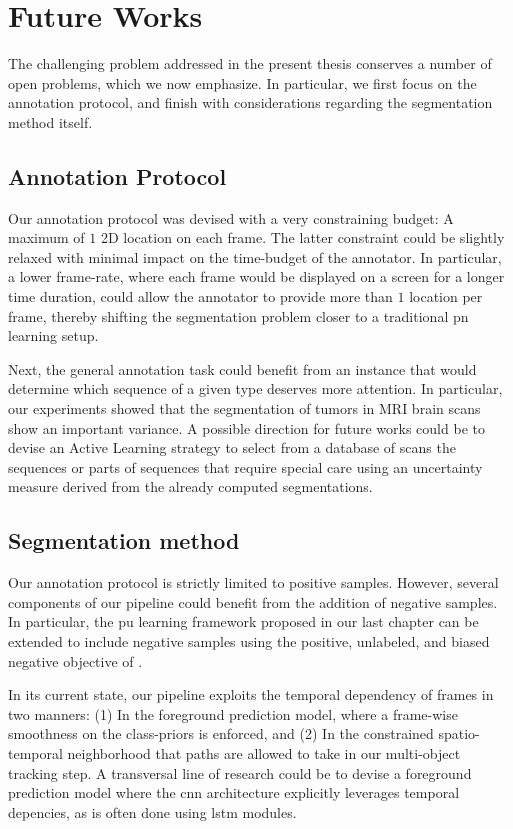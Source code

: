 \section{Future Works}

The challenging problem addressed in the present thesis conserves a number of open problems, which we now emphasize.
In particular, we first focus on the annotation protocol, and finish with considerations regarding the segmentation method itself.

\subsection{Annotation Protocol}
Our annotation protocol was devised with a very constraining budget: A maximum of $1$ 2D location on each frame.
The latter constraint could be slightly relaxed with minimal impact on the time-budget of the annotator.
In particular, a lower frame-rate, where each frame would be displayed on a screen for a longer time duration, could allow the annotator to provide more than $1$ location per frame, thereby shifting the segmentation problem closer to a traditional \gls{pn} learning setup.

Next, the general annotation task could benefit from an instance that would determine which sequence of a given type deserves more attention.
In particular, our experiments showed that the segmentation of tumors in MRI brain scans show an important variance.
A possible direction for future works could be to devise an Active Learning strategy to select from a database of scans the sequences or parts of sequences that require special care using an uncertainty measure derived from the already computed segmentations.

\subsection{Segmentation method}
Our annotation protocol is strictly limited to positive samples.
However, several components of our pipeline could benefit from the addition of negative samples.
In particular, the \gls{pu} learning framework proposed in our last chapter can be extended to include negative samples using the positive, unlabeled, and biased negative objective of \cite{hsieh19}.

In its current state, our pipeline exploits the temporal dependency of frames in two manners: (1) In the foreground prediction model, where a frame-wise smoothness on the class-priors is enforced, and (2) In the constrained spatio-temporal neighborhood that paths are allowed to take in our multi-object tracking step.
A transversal line of research could be to devise a foreground prediction model where the \gls{cnn} architecture explicitly leverages temporal depencies, as is often done using \gls{lstm} modules.

